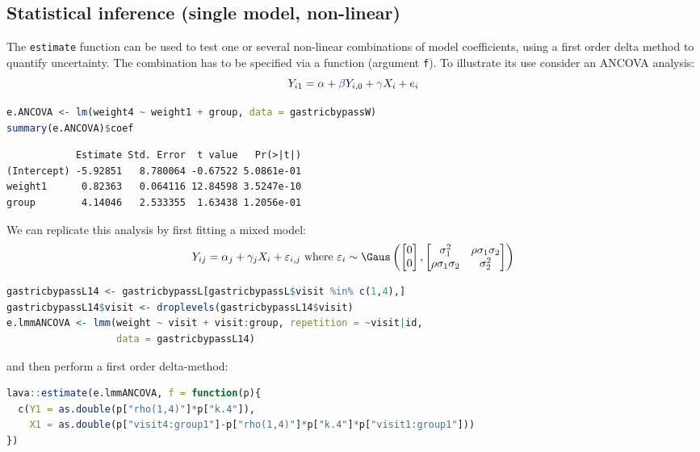 \documentclass[12pt]{article}
\newcommand{\darkblue}{blue!80!black}
\newcommand{\darkgreen}{green!50!black}
\newcommand{\darkred}{red!50!black}
\begin{document}
\clearpage
\subsection{Statistical inference (single model, non-linear)}
\label{sec:org99eabd4}

The \texttt{estimate} function can be used to test one or several non-linear
combinations of model coefficients, using a first order delta method
to quantify uncertainty. The combination has to be specified via a
function (argument \texttt{f}). To illustrate its use consider an ANCOVA
analysis:
\[ Y_{i1} = \textcolor{\darkred}{\alpha} + \textcolor{\darkblue}{\beta} Y_{i,0} + \textcolor{\darkgreen}{\gamma} X_{i} + e_{i} \]

\begin{lstlisting}[language=r,numbers=none]
e.ANCOVA <- lm(weight4 ~ weight1 + group, data = gastricbypassW)
summary(e.ANCOVA)$coef
\end{lstlisting}

\label{}
\begin{verbatim}
            Estimate Std. Error  t value   Pr(>|t|)
(Intercept) -5.92851   8.780064 -0.67522 5.0861e-01
weight1      0.82363   0.064116 12.84598 3.5247e-10
group        4.14046   2.533355  1.63438 1.2056e-01
\end{verbatim}


We can replicate this analysis by first fitting a mixed model:
\[ Y_{ij} = \alpha_j + \gamma_j X_{i} + \varepsilon_{i,j} \text{ where } \varepsilon_i \sim \Gaus \left( \begin{bmatrix} 0 \\ 0 \end{bmatrix}, \begin{bmatrix} \sigma^2_1 & \rho \sigma_1 \sigma_2 \\ \rho \sigma_1 \sigma_2 & \sigma^2_2 \end{bmatrix} \right) \]
\begin{lstlisting}[language=r,numbers=none]
gastricbypassL14 <- gastricbypassL[gastricbypassL$visit %in% c(1,4),]
gastricbypassL14$visit <- droplevels(gastricbypassL14$visit)
e.lmmANCOVA <- lmm(weight ~ visit + visit:group, repetition = ~visit|id,
                   data = gastricbypassL14)
\end{lstlisting}

and then perform a first order delta-method:
\begin{lstlisting}[language=r,numbers=none]
lava::estimate(e.lmmANCOVA, f = function(p){
  c(Y1 = as.double(p["rho(1,4)"]*p["k.4"]),
    X1 = as.double(p["visit4:group1"]-p["rho(1,4)"]*p["k.4"]*p["visit1:group1"]))
})
\end{lstlisting}
\end{document}
